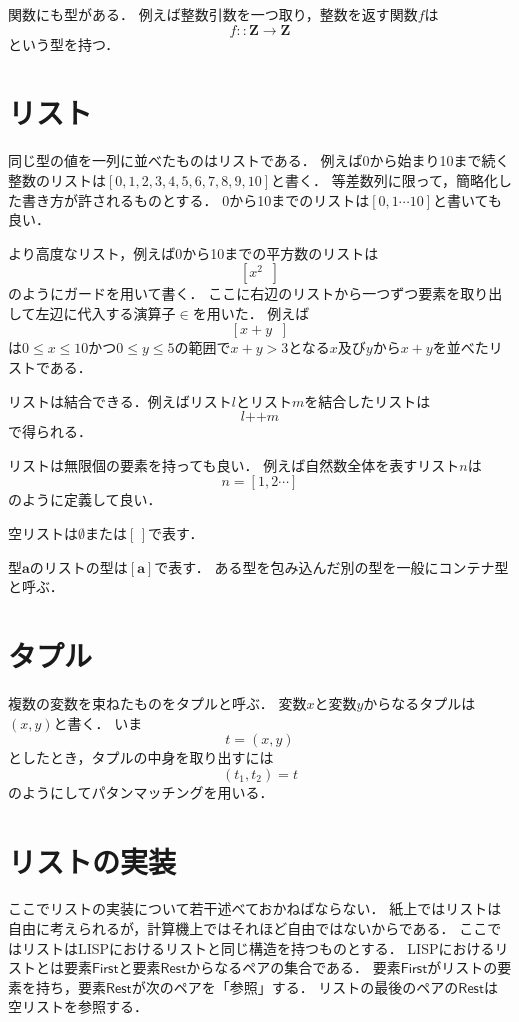 \documentclass[twocolumn]{jsbook}
\newcommand{\guard}[1]{\mathop{\mid_{{#1}}}}
\newcommand{\listappend}{\mathop{++}}
\newcommand{\typename}[1]{\bm{#1}}
\newcommand{\integertype}{\typename{Z}}
\newcommand{\specialkeyword}[1]{\textsf{#1}}
\newcommand{\firstelem}{\specialkeyword{First}}
\newcommand{\restelems}{\specialkeyword{Rest}}
\begin{document}
関数にも型がある．
例えば整数引数を一つ取り，整数を返す関数$f$は$$f::\integertype\rightarrow\integertype$$という型を持つ．

\section{リスト}

同じ型の値を一列に並べたものはリストである．
例えば0から始まり10まで続く整数のリストは$[0,1,2,3,4,5,6,7,8,9,10]$と書く．
等差数列に限って，簡略化した書き方が許されるものとする．
0から10までのリストは$[0,1\dotsb10]$と書いても良い．

より高度なリスト，例えば0から10までの平方数のリストは$$\left[x^2\guard{x\in[0,1\dotsb 10]}\right]$$のようにガードを用いて書く．
ここに右辺のリストから一つずつ要素を取り出して左辺に代入する演算子$\in$を用いた．
例えば$$\left[x+y\guard{x\in[0,1\dotsb 10]\wedge y\in[0,1\dotsb 5]\wedge x+y>3}\right]$$は$0\le x\le 10$かつ$0\le y\le 5$の範囲で$x+y>3$となる$x$及び$y$から$x+y$を並べたリストである．

リストは結合できる．例えばリスト$l$とリスト$m$を結合したリストは$$l\listappend m$$で得られる．

リストは無限個の要素を持っても良い．
例えば自然数全体を表すリスト$n$は$$n=[1,2\dotsb]$$のように定義して良い．

空リストは$\emptyset$または$[\,]$で表す．

型$\typename{a}$のリストの型は$[\typename{a}]$で表す．
ある型を包み込んだ別の型を一般にコンテナ型と呼ぶ．

\section{タプル}

複数の変数を束ねたものをタプルと呼ぶ．
変数$x$と変数$y$からなるタプルは$(x,y)$と書く．
いま$$t=(x,y)$$としたとき，タプルの中身を取り出すには$$(t_1,t_2)=t$$のようにしてパタンマッチングを用いる．

\section{リストの実装}

ここでリストの実装について若干述べておかねばならない．
紙上ではリストは自由に考えられるが，計算機上ではそれほど自由ではないからである．
ここではリストはLISPにおけるリストと同じ構造を持つものとする．
LISPにおけるリストとは要素$\firstelem$と要素$\restelems$からなるペアの集合である．
要素$\firstelem$がリストの要素を持ち，要素$\restelems$が次のペアを「参照」する．
リストの最後のペアの$\restelems$は空リストを参照する．
\end{document}
